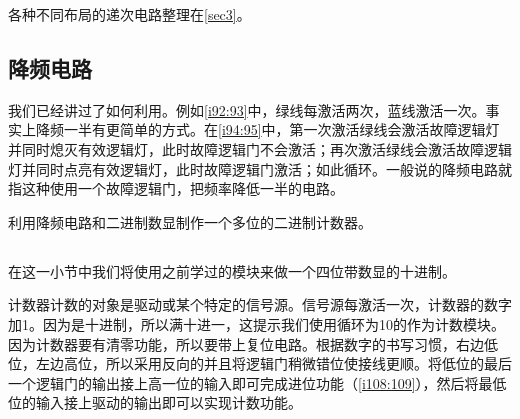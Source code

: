 各种不同布局的递次电路整理在\autoref{sec3}。

\subsection{降频电路}\label{sec2:1}

我们已经讲过了如何利用\ShiftRegister{}。例如\autoref{i92:93}中，绿线每激活两次，蓝线激活一次。事实上降频一半有更简单的方式。在\autoref{i94:95}中，第一次激活绿线会激活故障逻辑灯并同时熄灭有效逻辑灯，此时故障逻辑门不会激活；再次激活绿线会激活故障逻辑灯并同时点亮有效逻辑灯，此时故障逻辑门激活；如此循环。一般说的降频电路就指这种使用一个故障逻辑门，把频率降低一半的电路。

\begin{figure}[!ht]
  \centering
  \caption{}
  \label{i92:97}
\end{figure}

\begin{problem}{}{}
  利用降频电路和二进制数显制作一个多位的二进制计数器。
\end{problem}

\subsection{}

在这一小节中我们将使用之前学过的模块来做一个四位带数显的十进制。

计数器计数的对象是驱动或某个特定的信号源。信号源每激活一次，计数器的数字加1。因为是十进制，所以满十进一，这提示我们使用循环为10的\myind{\ShiftRegister}作为计数模块。因为计数器要有清零功能，所以\ShiftRegister 要带上复位电路。根据数字的书写习惯，右边低位，左边高位，所以采用反向的\ShiftRegister 并且将逻辑门稍微错位使接线更顺。将低位的\ShiftRegister 最后一个逻辑门的输出接上高一位\ShiftRegister 的输入即可完成进位功能（\autoref{i108:109}），然后将最低位的\ShiftRegister 输入接上驱动的输出即可以实现计数功能。

